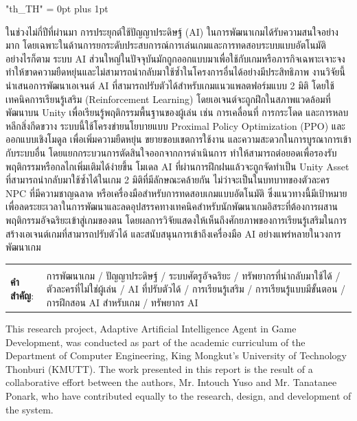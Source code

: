 \documentclass[12pt,oneside,openright,a4paper]{cpe-english-project}
\begin{document}
{
\XeTeXlinebreaklocale "th_TH"	
\XeTeXlinebreakskip = 0pt plus 1pt
\thaifont
\thaiabstract

ในช่วงไม่กี่ปีที่ผ่านมา การประยุกต์ใช้ปัญญาประดิษฐ์ (AI) ในการพัฒนาเกมได้รับความสนใจอย่างมาก โดยเฉพาะในด้านการยกระดับประสบการณ์การเล่นเกมและการทดสอบระบบแบบอัตโนมัติ อย่างไรก็ตาม ระบบ AI ส่วนใหญ่ในปัจจุบันมักถูกออกแบบมาเพื่อใช้กับเกมหรือภารกิจเฉพาะเจาะจง ทำให้ขาดความยืดหยุ่นและไม่สามารถนำกลับมาใช้ซ้ำในโครงการอื่นได้อย่างมีประสิทธิภาพ งานวิจัยนี้นำเสนอการพัฒนาเอเจนต์ AI ที่สามารถปรับตัวได้สำหรับเกมแนวแพลตฟอร์มแบบ 2 มิติ โดยใช้เทคนิคการเรียนรู้เสริม (Reinforcement Learning) โดยเอเจนต์จะถูกฝึกในสภาพแวดล้อมที่พัฒนาบน Unity เพื่อเรียนรู้พฤติกรรมพื้นฐานของผู้เล่น เช่น การเคลื่อนที่ การกระโดด และการหลบหลีกสิ่งกีดขวาง ระบบนี้ใช้โครงข่ายนโยบายแบบ Proximal Policy Optimization (PPO) และออกแบบเชิงโมดูล เพื่อเพิ่มความยืดหยุ่น ขยายขอบเขตการใช้งาน และความสะดวกในการบูรณาการเข้ากับระบบอื่น โดยแยกกระบวนการตัดสินใจออกจากการดำเนินการ ทำให้สามารถต่อยอดเพื่อรองรับพฤติกรรมหรือกลไกเพิ่มเติมได้ง่ายขึ้น โมเดล AI ที่ผ่านการฝึกฝนแล้วจะถูกจัดทำเป็น Unity Asset ที่สามารถนำกลับมาใช้ซ้ำได้ในเกม 2 มิติที่มีลักษณะคล้ายกัน ไม่ว่าจะเป็นในบทบาทของตัวละคร NPC ที่มีความชาญฉลาด หรือเครื่องมือสำหรับการทดสอบเกมแบบอัตโนมัติ ซึ่งแนวทางนี้มีเป้าหมายเพื่อลดระยะเวลาในการพัฒนาและลดอุปสรรคทางเทคนิคสำหรับนักพัฒนาเกมอิสระที่ต้องการผสานพฤติกรรมอัจฉริยะเข้าสู่เกมของตน โดยผลการวิจัยแสดงให้เห็นถึงศักยภาพของการเรียนรู้เสริมในการสร้างเอเจนต์เกมที่สามารถปรับตัวได้ และสนับสนุนการเข้าถึงเครื่องมือ AI อย่างแพร่หลายในวงการพัฒนาเกม


\begin{flushleft}
\begin{tabular*}{\textwidth}{@{}lp{}}
 & \\

\textbf{คำสำคัญ}: & การพัฒนาเกม / ปัญญาประดิษฐ์ / ระบบศัตรูอัจฉริยะ / ทรัพยากรที่นำกลับมาใช้ได้ / ตัวละครที่ไม่ใช่ผู้เล่น / AI ที่ปรับตัวได้ / การเรียนรู้เสริม / การเรียนรู้แบบมีขั้นตอน / การฝึกสอน AI สำหรับเกม / ทรัพยากร AI
\end{tabular*}
\end{flushleft}
\endabstract
}

\preface
\quad This research project, Adaptive Artificial Intelligence Agent in Game Development, was conducted as part of the academic curriculum of the Department of Computer Engineering, King Mongkut’s University of Technology Thonburi (KMUTT). The work presented in this report is the result of a collaborative effort between the authors, Mr. Intouch Yuso and Mr. Tanatanee Ponark, who have contributed equally to the research, design, and development of the system.\par
\end{document}
